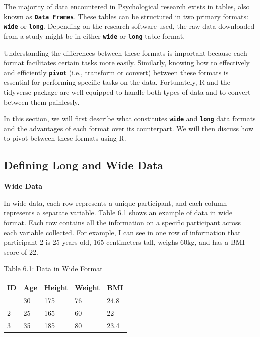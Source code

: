 \documentclass[
]{book}
\begin{document}
The majority of data encountered in Psychological research exists in tables, also known as \textbf{\texttt{Data\ Frames}}. These tables can be structured in two primary formats: \textbf{\texttt{wide}} or \textbf{\texttt{long}}. Depending on the research software used, the raw data downloaded from a study might be in either \textbf{\texttt{wide}} or \textbf{\texttt{long}} table format.

Understanding the differences between these formats is important because each format facilitates certain tasks more easily. Similarly, knowing how to effectively and efficiently \textbf{\texttt{pivot}} (i.e., transform or convert) between these formats is essential for performing specific tasks on the data. Fortunately, R and the tidyverse package are well-equipped to handle both types of data and to convert between them painlessly.

In this section, we will first describe what constitutes \textbf{\texttt{wide}} and \textbf{\texttt{long}} data formats and the advantages of each format over its counterpart. We will then discuss how to pivot between these formats using R.

\hypertarget{defining-long-and-wide-data}{%
\subsection{Defining Long and Wide Data}\label{defining-long-and-wide-data}}

\textbf{Wide Data}

In wide data, each row represents a unique participant, and each column represents a separate variable. Table 6.1 shows an example of data in wide format. Each row contains all the information on a specific participant across each variable collected. For example, I can see in one row of information that participant 2 is 25 years old, 165 centimeters tall, weighs 60kg, and has a BMI score of 22.

Table 6.1: Data in Wide Format

\begin{longtable}[]{@{}lllll@{}}
\toprule\noalign{}
ID & Age & Height & Weight & BMI \\
\midrule\noalign{}
\endhead
\bottomrule\noalign{}
\endlastfoot
1 & 30 & 175 & 76 & 24.8 \\
2 & 25 & 165 & 60 & 22 \\
3 & 35 & 185 & 80 & 23.4 \\
\end{longtable}
\end{document}
